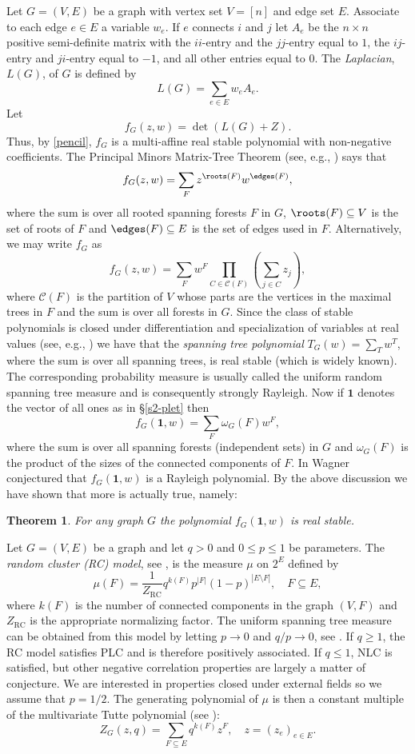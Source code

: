 \documentclass[10pt,reqno]{amsart}
\theoremstyle{plain}
\newtheorem{theorem}{Theorem}[section]
\theoremstyle{definition}
\theoremstyle{remark}
\newcommand{\ben}{\mathbf{1}}
\begin{document}
Let $G=(V,E)$ be a graph with vertex set $V=[n]$ and edge set $E$. Associate 
to each edge $e \in E$ a variable $w_e$. If $e$ connects $i$ and $j$ let 
$A_e$ be the $n \times n$ positive semi-definite matrix with the $ii$-entry 
and 
the $jj$-entry equal to $1$, the $ij$-entry and $ji$-entry equal to $-1$, 
and all other entries equal to $0$. The {\em Laplacian}, $L(G)$,  of $G$ is 
defined by 
$$
L(G)= \sum_{e \in E}w_eA_e.
$$
Let
$$
f_G(z,w)= \det(L(G)+Z).
$$
Thus, by \eqref{pencil}, $f_G$ is a multi-affine real stable polynomial with 
non-negative coefficients.   
The Principal Minors Matrix-Tree Theorem (see, e.g., \cite{Chaiken}) says that 
$$
 f_G(z,w)= \sum_{F}z^{\roots(F)}w^{\edges(F)}, 
$$ 
where the sum is over all rooted spanning forests $F$ in $G$, $\roots(F) 
\subseteq V$ is the set of roots 
of $F$ and $\edges(F) \subseteq E$ is the set of edges used in $F$. 
Alternatively, we may write $f_G$ as 
$$
f_G(z,w)= \sum_{F} w^F \prod_{C \in \mathcal{C}(F)} (\sum_{j \in C}z_j),
$$
where $\mathcal{C}(F)$ is the partition of $V$ whose parts are the vertices 
in the maximal trees in $F$ and the sum is over all forests in $G$.  Since 
the class of stable polynomials is closed under differentiation and 
specialization of  variables at real values (see, e.g., \cite{BBS2}) we have 
that the {\em spanning tree polynomial} $T_G(w)= \sum_Tw^T$, where the sum is 
over all spanning trees, is real stable (which is widely known).  The 
corresponding probability measure is usually called the uniform random 
spanning tree measure and is consequently strongly Rayleigh. Now if 
$\ben$ denotes the vector of all ones as in \S \ref{s2-plet} then 
$$
f_G(\ben,w)= \sum_{F} \omega_G(F)w^F,
$$
where the sum is over all spanning forests (independent sets) in $G$ and 
 $\omega_G(F)$ is the product of the sizes of the connected components of 
$F$. In \cite[Conjecture~5.10]{W} Wagner conjectured that $f_G(\ben,w)$ is a 
Rayleigh polynomial. By the above discussion we have shown that more is 
actually true, namely:

\begin{theorem}\label{t-fg}
For any graph $G$ the polynomial $f_G(\ben,w)$ is real stable.
\end{theorem}

Let $G=(V,E)$ be a graph and let $q>0$ and $0 \leq p \leq 1$ be parameters. 
The {\em random cluster (RC) model}, see \cite{grimmett},  
is the measure $\mu$ on $2^E$ defined 
by 
$$
\mu(F) = \frac 1 {Z_{\text{RC}}} q^{k(F)}p^{|F|}(1-p)^{|E \setminus F|},  
\quad F \subseteq E, 
$$
where $k(F)$ is the number of connected components in the graph $(V,F)$ and 
$Z_{\text{RC}}$ is the appropriate normalizing factor.  
The uniform spanning tree measure can be obtained
from this model by letting $p\to 0$ and $q/p \to 0$, see 
\cite[Section 1.5]{grimmett}. If
$q\geq 1$, the
RC model satisfies PLC and is therefore positively associated. 
If $q\leq1$, NLC is
satisfied, but other negative correlation properties are largely a matter of
conjecture. 
We are interested in properties closed under external fields so we assume 
that $p=1/2$. The generating polynomial of $\mu$ is then a constant multiple 
of the multivariate Tutte polynomial (see \cite{sok}):
$$
Z_G(z,q)= \sum_{F \subseteq E}q^{k(F)}z^F, \quad z=(z_e)_{e\in E}.
$$
\end{document}
